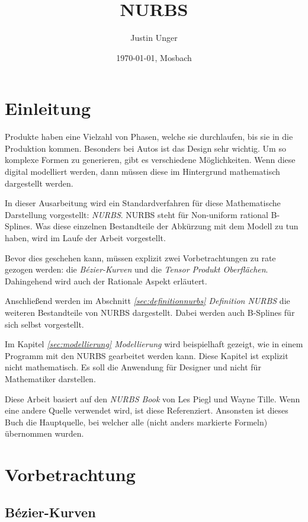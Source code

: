 \documentclass[11pt]{article}
\title{NURBS}
\author{Justin Unger}
\date{\today{}, Mosbach}
\begin{document}
\maketitle
\tableofcontents

\section{Einleitung}
\label{sec:einleitung}
Produkte haben eine Vielzahl von Phasen, welche sie durchlaufen, bis sie in die Produktion kommen.
Besonders bei Autos ist das Design sehr wichtig.
Um so komplexe Formen zu generieren, gibt es verschiedene Möglichkeiten.
Wenn diese digital modelliert werden, dann müssen diese im Hintergrund mathematisch dargestellt werden. 

In dieser Ausarbeitung wird ein Standardverfahren für diese Mathematische Darstellung vorgestellt: \emph{NURBS}.
NURBS steht für Non-uniform rational B-Splines. 
Was diese einzelnen Bestandteile der Abkürzung mit dem Modell zu tun haben, wird im Laufe der Arbeit vorgestellt.

Bevor dies geschehen kann, müssen explizit zwei Vorbetrachtungen zu rate gezogen werden: die \emph{Bézier-Kurven} und die \emph{Tensor Produkt Oberflächen}.
Dahingehend wird auch der Rationale Aspekt erläutert.

Anschließend werden im Abschnitt  \emph{\ref{sec:definitionnurbs} Definition NURBS} die weiteren Bestandteile von NURBS dargestellt.
Dabei werden auch B-Splines für sich selbst vorgestellt.

Im Kapitel \emph{\ref{sec:modellierung} Modellierung} wird beispielhaft gezeigt, wie in einem Programm mit den NURBS gearbeitet werden kann. 
Diese Kapitel ist explizit nicht mathematisch. 
Es soll die Anwendung für Designer und nicht für Mathematiker darstellen. 

Diese Arbeit basiert auf den \emph{NURBS Book} von Les Piegl und Wayne Tille. 
Wenn eine andere Quelle verwendet wird, ist diese Referenziert.
Ansonsten ist dieses Buch die Hauptquelle, bei welcher alle (nicht anders markierte Formeln) übernommen wurden. 

\section{Vorbetrachtung}
\label{sec:vorbetrachtung}
\subsection{Bézier-Kurven}
\label{sec:bezierkurven}
\end{document}
